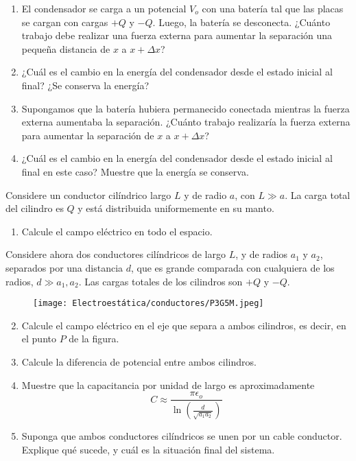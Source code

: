 \begin{enumerate}[label=\alph*)]
    \item El condensador se carga a un potencial $V_o$ con una batería tal que las placas se cargan con cargas $+Q$ y $-Q$. Luego, la batería se desconecta. ¿Cuánto trabajo debe realizar una fuerza externa para aumentar la separación una pequeña distancia de $x$ a $x + \Delta x$?
    \item ¿Cuál es el cambio en la energía del condensador desde el estado inicial al final? ¿Se conserva la energía?
    \item Supongamos que la batería hubiera permanecido conectada mientras la fuerza externa aumentaba la separación. ¿Cuánto trabajo realizaría la fuerza externa para aumentar la separación de $x$ a $x + \Delta x$?
    \item ¿Cuál es el cambio en la energía del condensador desde el estado inicial al final en este caso? Muestre que la energía se conserva. 
\end{enumerate}
\bigbreak
\bigbreak
\np

Considere un conductor cilíndrico largo $L$ y de radio $a$, con $L\gg a$. La carga total del cilindro es $Q$ y está distribuida uniformemente en su manto.

\begin{enumerate}[label=\alph*)]
    \item Calcule el campo eléctrico en todo el espacio.
\end{enumerate}

Considere ahora dos conductores cilíndricos de largo $L$, y de radios $a_1$ y $a_2$, separados por una distancia $d$, que es grande comparada con cualquiera de los radios, $d\gg a_1, a_2$. Las cargas totales de los cilindros son $+Q$ y $-Q$.

\begin{figure}[H]
    \centering
    \texttt{[image: Electroestática/conductores/P3G5M.jpeg]}
\end{figure}

\begin{enumerate}[label=\alph*)]\setcounter{enumi}{1}
    \item Calcule el campo eléctrico en el eje que separa a ambos cilindros, es decir, en el punto $P$ de la figura.
    \item Calcule la diferencia de potencial entre ambos cilindros.
    \item Muestre que la capacitancia por unidad de largo es aproximadamente
    \[C\approx\frac{\pi\epsilon_o}{\ln\left(
    \frac{d}{\sqrt{a_1a_2}}\right)}\]
    \item Suponga que ambos conductores cilíndricos se unen por un cable conductor. Explique qué sucede, y cuál es la situación final del sistema.
\end{enumerate}
\bigbreak
\bigbreak
\np

